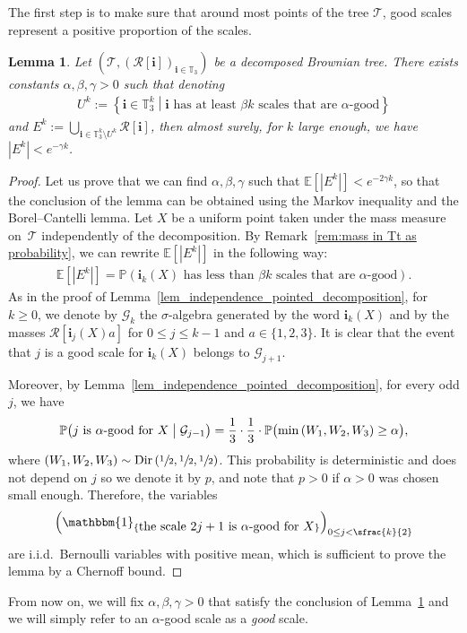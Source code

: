 \documentclass[JEP,XML,SOM,Unicode,NoFloatCountersInSection,published]{cedram}
\let\backslash\setminus
\newcommand{\Ec}[1]{\mathbb{E} \left[#1\right]}
\newcommand{\Pp}[1]{\mathbb{P} \left(#1\right)}
\newcommand{\bPp}[1]{\mathbb{P} \bigl(#1\bigr)}
\newcommand{\bPpsq}[2]{\mathbb{P} \bigl(#1\bigm|#2\bigr)}
\newcommand{\enstq}[2]{\left\lbrace#1\mathrel{}\middle|\mathrel{}#2\right\rbrace}
\newcommand{\Tt}{\mathcal{T}}
\newcommand{\Rr}{\mathcal{R}}
\newcommand{\ii}{\mathbf{i}}
\newcommand{\Dir}{\mathrm{Dir}}
\theoremstyle{plain}
\newtheorem{lemma}[theorem]{Lemma}
\theoremstyle{definition}
\begin{document}
The first step is to make sure that around most points of the tree $\Tt$, good scales represent a positive proportion of the scales.
\begin{lemma}\label{lem_many_good_scales}
Let $\left( \Tt, \left( \Rr[\ii] \right)_{\ii \in \mathbb{T}_3} \right)$ be a decomposed Brownian tree.
There exists constants $\alpha, \beta, \gamma>0$ such that denoting
\begin{align*}
U^k:= \enstq{\ii \in \mathbb{T}_3^k}{\ii \mbox{ has at least $\beta k$ scales that are $\alpha$-good}}
\end{align*}
and $E^k:=\bigcup_{\ii \in \mathbb{T}_3^k \backslash U^k} \Rr[\ii]$, then almost surely, for $k$ large enough, we have
$|E^k| < e^{-\gamma k }$.
\end{lemma}

\begin{proof}
Let us prove that we can find $\alpha,\beta,\gamma$ such that $\Ec{|E^k|}<e^{-2\gamma k}$, so that the conclusion of the lemma can be obtained using the Markov inequality and the Borel--Cantelli lemma.
Let $X$ be a uniform point taken under the mass measure on~$\Tt$ independently of the decomposition.
By Remark~\ref{rem:mass in Tt as probability}, we can rewrite $\Ec{|E^k|}$ in the following way:
\begin{align*}
\Ec{|E^k|}
= \Pp{\ii_k(X) \mbox{ has less than $\beta k$ scales that are $\alpha$-good}}.
\end{align*}
As in the proof of Lemma~\ref{lem_independence_pointed_decomposition}, for $k \geq 0$, we denote by $\mathcal{G}_k$ the $\sigma$-algebra generated by the word $\ii_k(X)$ and by the masses $\Rr[\ii_j (X) a]$ for $0 \leq j \leq k-1$ and $a \in \{1,2,3\}$. It is clear that the event that $j$ is a good scale for $\ii_k(X)$ belongs to $\mathcal{G}_{j+1}$.

Moreover, by Lemma~\ref{lem_independence_pointed_decomposition}, for every odd $j$, we have
\begin{align} \label{eq:probability that next scale is good}
\bPpsq{\mbox{$j$ is $\alpha$-good for $X$}}{ \mathcal{G}_{j-1}} = \frac{1}{3} \cdot \frac{1}{3} \cdot \bPp{ \min \left( W_1, W_2, W_3 \right) \geq \alpha},
\end{align}
where $(W_1,W_2,W_3) \sim \Dir \left( \sfrac12, \sfrac12, \sfrac12 \right)$.
This probability is deterministic and does not depend on $j$ so we denote it by $p$, and note that $p>0$ if $\alpha>0$ was chosen small enough.
Therefore, the variables
\begin{align*}
\left( \mathbbm{1}_{\{\mbox{the scale $2j+1$ is $\alpha$-good for $X$}\}} \right)_{0 \leq j < \sfrac{k}{2}}
\end{align*}
are i.i.d.\ Bernoulli variables with positive mean, which is sufficient to prove the lemma by a Chernoff bound.
\end{proof}
From now on, we will fix $\alpha, \beta, \gamma>0$ that satisfy the conclusion of Lemma~\ref{lem_many_good_scales} and we will simply refer to an $\alpha$-good scale as a \emph{good} scale.
\end{document}
